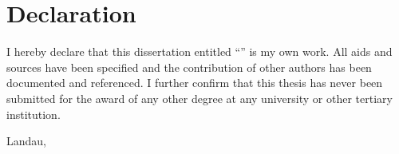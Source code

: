 
\chapter{Declaration}

I hereby declare that this dissertation entitled ``\plaintitle '' is my own work. All aids and sources have been specified and the contribution of other authors has been documented and referenced.
I further confirm that this thesis has never been submitted for the award of any other degree at any university or other tertiary institution.

\vspace{6.5em}

\noindent Landau, \thedate
